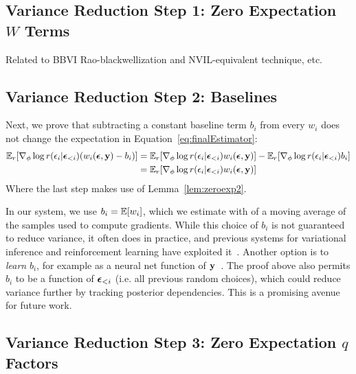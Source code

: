 \subsection{Variance Reduction Step 1: Zero Expectation $W$ Terms}


Related to BBVI Rao-blackwellization and NVIL-equivalent technique, etc.

\subsection{Variance Reduction Step 2: Baselines}

Next, we prove that subtracting a constant baseline term $b_i$ from every $w_i$ does not change the expectation in Equation~\ref{eq:finalEstimator}:
\begin{align*}
\expect_\reparamDist [ \gradparams \log \reparamDist(\reparamVar_i | \reparamVars_{<i}) (w_i(\reparamVars, \observedVars) - b_i) ]
%
&= \expect_\reparamDist [ \gradparams \log \reparamDist(\reparamVar_i | \reparamVars_{<i}) w_i(\reparamVars, \observedVars) ] - \expect_\reparamDist[ \gradparams \log \reparamDist(\reparamVar_i | \reparamVars_{<i}) b_i ]\\
%
&= \expect_\reparamDist [ \gradparams \log \reparamDist(\reparamVar_i | \reparamVars_{<i}) w_i(\reparamVars, \observedVars) ] 
\end{align*}
Where the last step makes use of Lemma~\ref{lem:zeroexp2}.

In our system, we use $b_i = \mathbb{E}[ w_i ]$, which we estimate with of a moving average of the samples used to compute gradients. While this choice of $b_i$ is not guaranteed to reduce variance, it often does in practice, and previous systems for variational inference and reinforcement learning have exploited it~\cite{BBVI,StochasticComputationGraphs,VarianceReduction}. Another option is to \emph{learn} $b_i$, for example as a neural net function of $\mathbf{y}$~\cite{NVIL}. The proof above also permits $b_i$ to be a function of $\bm{\epsilon}_{<i}$ (i.e. all previous random choices), which could reduce variance further by tracking posterior dependencies. This is a promising avenue for future work.

\subsection{Variance Reduction Step 3: Zero Expectation $q$ Factors}

